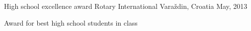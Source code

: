 \begin{cventries}
  \cventry
    {High school excellence award} %
    {Rotary International} %
    {Varaždin, Croatia} %
    {May, 2013} %
    {
      \begin{cvitems} %
        \item {Award for best high school students in class}
      \end{cvitems}
    }

\end{cventries}
